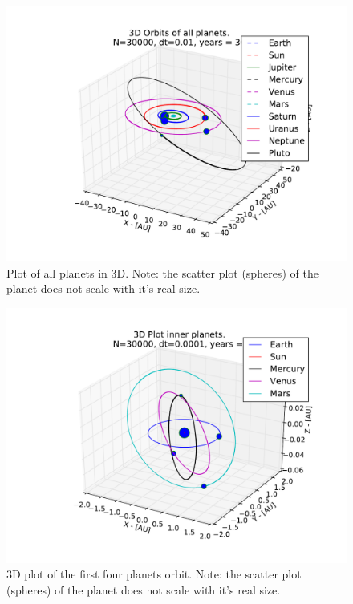 \documentclass[12pt]{article}
\begin{document}
\begin{figure}[hbtp]
\centering
\includegraphics[width=\linewidth]{Plots/All_planets_3D_plot.pdf}
\caption{Plot of all planets in 3D. Note: the scatter plot (spheres) of the planet does not scale with it's real size.}
\end{figure}
\begin{figure}[hbtp]
\centering
\includegraphics[width=\linewidth]{Plots/First_planets_3D_plot.pdf}
\caption{3D plot of the first four planets orbit. Note: the scatter plot (spheres) of the planet does not scale with it's real size.}
\end{figure}

\newpage
\end{document}
